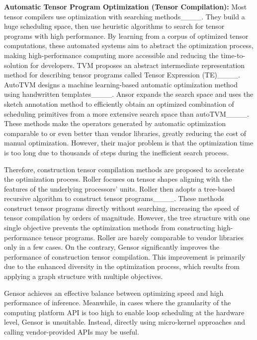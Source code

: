 \textbf{Automatic Tensor Program Optimization (Tensor Compilation): }Most tensor compilers use optimization with searching methods____. They build a huge scheduling space, then use heuristic algorithms to search for tensor programs with high performance. By learning from a corpus of optimized tensor computations, these automated systems aim to abstract the optimization process, making high-performance computing more accessible and reducing the time-to-solution for developers. TVM proposes an abstract intermediate representation method for describing tensor programs called Tensor Expression (TE)____. 
AutoTVM designs a machine learning-based automatic optimization method using handwritten templates____. Ansor expands the search space and uses the sketch annotation method to efficiently obtain an optimized combination of scheduling primitives from a more extensive search space than autoTVM____. 
These methods make the operators generated by automatic optimization comparable to or even better than vendor libraries, greatly reducing the cost of manual optimization. However, their major problem is that the optimization time is too long due to thousands of steps during the inefficient search process.

Therefore, construction tensor compilation methods are proposed to accelerate the optimization process. Roller focuses on tensor shapes aligning with the features of the underlying processors' units. Roller then adopts a tree-based recursive algorithm to construct tensor programs____. These methods construct tensor programs directly without searching, increasing the speed of tensor compilation by orders of magnitude. However, the tree structure with one single objective prevents the optimization methods from constructing high-performance tensor programs. Roller are barely comparable to vendor libraries only in a few cases.
On the contrary, Gensor significantly improves the performance of construction tensor compilation. This improvement is primarily due to the enhanced diversity in the optimization process, which results from applying a graph structure with multiple objectives.


Gensor achieves an effective balance between optimizing speed and high performance of inference. Meanwhile, in cases where the granularity of the computing platform API is too high to enable loop scheduling at the hardware level, Gensor is unsuitable. Instead, directly using micro-kernel approaches and calling vendor-provided APIs may be useful.